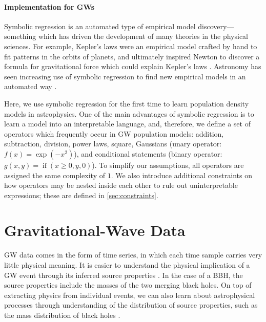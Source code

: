 \documentclass[nohyperref]{article}
\theoremstyle{plain}
\theoremstyle{definition}
\theoremstyle{remark}
\begin{document}
\paragraph{Implementation for GWs}
Symbolic regression is an automated type of empirical model discovery---something which has driven the development of many theories in the physical sciences.
For example, Kepler's laws were an empirical model crafted by hand to fit patterns in the orbits of planets, and ultimately inspired Newton to discover a formula for gravitational force which could explain Kepler's laws \citep[see][for a review of this history]{hawkingShouldersGiantsGreat2004}.
Astronomy has seen increasing use of symbolic regression to find new empirical models in an automated way \citep[e.g.,][]{grahamMachineassistedDiscoveryRelationships2013,cranmerDiscoveringSymbolicModels2020,wadekarModelingAssemblyBias2020,delgadoModelingGalaxyhaloConnection2021,cranmerHistogramPoolingOperators2021,shaoFindingUniversalRelations2021}.

Here, we use symbolic regression for the first time to learn population density models in astrophysics.
One of the main advantages of symbolic regression is to learn a model into an interpretable language, and, therefore, we define a set of operators which frequently occur in GW population models: addition, subtraction, division, power laws, square, Gaussians (unary operator: $f(x)=\exp(-x^2)$), and conditional statements (binary operator: $g(x, y)=\operatorname{if}(x \geq 0, y, 0)$). 
To simplify our assumptions, all operators are assigned the same complexity of $1$.
We also introduce additional constraints on how operators may be nested inside each other to rule out uninterpretable expressions; these are defined in \cref{sec:constraints}.


\section{Gravitational-Wave Data}
\label{sec:GWdata}

GW data comes in the form of time series, in which each time sample carries very little physical meaning.
It is easier to understand the physical implication of a GW event through its inferred source properties \cite{Veitch:2014wba}.
In the case of a BBH, the source properties include the masses of the two merging black holes.
On top of extracting physics from individual events,
we can also learn about astrophysical processes through understanding of the distribution of source properties, such as the mass distribution of black holes \cite{2019PASA...36...10T,Vitale:2020aaz}.
\end{document}
